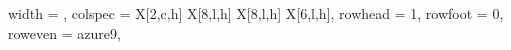 \documentclass[a4paper]{ctexbook}
\begin{document}
\begin{landscape}
{\begin{longtblr}[
      caption = {语阶中的四词及以上的词组},
      label = {tab:Four-word and Longer Lexical Bundles in Steps},
  ]{
      width = \linewidth,
      colspec = {X[2,c,h]  X[8,l,h]  X[8,l,h]  X[6,l,h]},
      rowhead = 1, rowfoot = 0, %
      row{even} = {azure9},
  }
  \bottomrule
  
  \end{longtblr}



  


}
\end{landscape}
\end{document}
